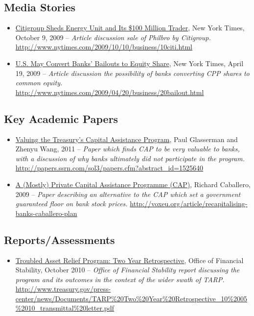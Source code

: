 \documentclass[12pt]{article}
\begin{document}
\subsection{Media Stories}

\begin{itemize}
\item
\ul{Citigroup Sheds Energy Unit and Its \$100 Million Trader}, New York Times, October 9,
  2009 -- \emph{Article discussion sale of Philbro by Citigroup.} \url{http://www.nytimes.com/2009/10/10/business/10citi.html}
\item
\ul{U.S. May Convert Banks’ Bailouts to Equity Share}, New York Times, April 19,
  2009 -- \emph{Article discussion the possibility of banks converting CPP shares to common equity.} \url{http://www.nytimes.com/2009/04/20/business/20bailout.html}
\end{itemize}

\subsection{Key Academic Papers}

\begin{itemize}
\item
\ul{Valuing the Treasury's Capital Assistance Program},
Paul Glasserman and Zhenyu Wang, 2011 -- \emph{Paper
which finds CAP to be very valuable to banks, with a discussion of why banks ultimately did not participate in the program.} \url{http://papers.ssrn.com/sol3/papers.cfm?abstract_id=1525640}
\item
\ul{A (Mostly) Private Capital Assistance Programme
(CAP)},
Richard Caballero, 2009 -- \emph{Paper describing an alternative to the CAP which set a government guaranteed floor on bank stock prices.} \url{http://voxeu.org/article/recapitalising-banks-caballero-plan}
\end{itemize}
\subsection{Reports/Assessments}

\begin{itemize}
\item
\ul{Troubled
  Asset Relief Program: Two Year Retrospective}, Office of Financial
  Stability, October 2010 -- \emph{Office of Financial Stability report
  discussing the program and its outcomes in the context of the wider
  swath of TARP.} \url{http://www.treasury.gov/press-center/news/Documents/TARP\%20Two\%20Year\%20Retrospective_10\%2005\%2010_transmittal\%20letter.pdf}
\end{itemize}
\end{document}
